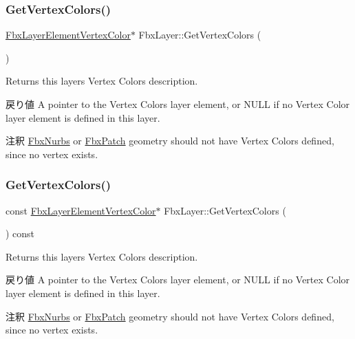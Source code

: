 \subsubsection{\texorpdfstring{Get\+Vertex\+Colors()}{GetVertexColors()}\hspace{0.1cm}{\footnotesize\ttfamily [1/2]}}
{\footnotesize\ttfamily \hyperlink{class_fbx_layer_element_vertex_color}{Fbx\+Layer\+Element\+Vertex\+Color}$\ast$ Fbx\+Layer\+::\+Get\+Vertex\+Colors (\begin{DoxyParamCaption}{ }\end{DoxyParamCaption})}

Returns this layer\textquotesingle{}s Vertex Colors description. \begin{DoxyReturn}{戻り値}
A pointer to the Vertex Colors layer element, or {\ttfamily N\+U\+LL} if no Vertex Color layer element is defined in this layer. 
\end{DoxyReturn}
\begin{DoxyRemark}{注釈}
\hyperlink{class_fbx_nurbs}{Fbx\+Nurbs} or \hyperlink{class_fbx_patch}{Fbx\+Patch} geometry should not have Vertex Colors defined, since no vertex exists. 
\end{DoxyRemark}
\mbox{\label{class_fbx_layer_ae13147ff5eb67684081f507e1654f46d}} 
\subsubsection{\texorpdfstring{Get\+Vertex\+Colors()}{GetVertexColors()}\hspace{0.1cm}{\footnotesize\ttfamily [2/2]}}
{\footnotesize\ttfamily const \hyperlink{class_fbx_layer_element_vertex_color}{Fbx\+Layer\+Element\+Vertex\+Color}$\ast$ Fbx\+Layer\+::\+Get\+Vertex\+Colors (\begin{DoxyParamCaption}{ }\end{DoxyParamCaption}) const}

Returns this layer\textquotesingle{}s Vertex Colors description. \begin{DoxyReturn}{戻り値}
A pointer to the Vertex Colors layer element, or {\ttfamily N\+U\+LL} if no Vertex Color layer element is defined in this layer. 
\end{DoxyReturn}
\begin{DoxyRemark}{注釈}
\hyperlink{class_fbx_nurbs}{Fbx\+Nurbs} or \hyperlink{class_fbx_patch}{Fbx\+Patch} geometry should not have Vertex Colors defined, since no vertex exists. 
\end{DoxyRemark}
\mbox{\label{class_fbx_layer_a6de0fbabb2845d0e90a0755c8e3382aa}} 
